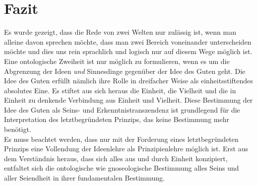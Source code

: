 \documentclass[12pt]{article}
\begin{document}
\section{Fazit}
Es wurde gezeigt, dass die Rede von zwei Welten nur zulässig ist, wenn man alleine davon sprechen möchte, dass man zwei Bereich voneinander unterscheiden möchte und dies uns rein sprachlich und logisch nur auf diesem Wege möglich ist. Eine ontologische Zweiheit ist nur möglich zu formulieren, wenn es um die Abgrenzung der Ideen \emph{und} Sinnesdinge gegenüber der Idee des Guten geht. Die Idee des Guten erfüllt nämlich ihre Rolle in dreifacher Weise als einheitsstiftendes absolutes Eine. Es stiftet aus sich heraus die Einheit, die Vielheit und die in Einheit zu denkende Verbindung aus Einheit und Vielheit. Diese Bestimmung der Idee des Guten als Seins- und Erkenntnistranszendenz ist grundlegend für die Interpretation des letztbegründeten Prinzips, das keine Bestimmung mehr benötigt.\\
Es muss beachtet werden, dass nur mit der Forderung eines letztbegründeten Prinzips eine Vollendung der Ideenlehre als Prinzipienlehre möglich ist. Erst aus dem Verständnis heraus, dass sich alles aus und durch Einheit konzipiert, entfaltet sich die ontologische wie gnoseologische Bestimmung alles Seins und aller Seiendheit in ihrer fundamentalen Bestimmung. 
\newpage
\nocite{politeia}
\end{document}

